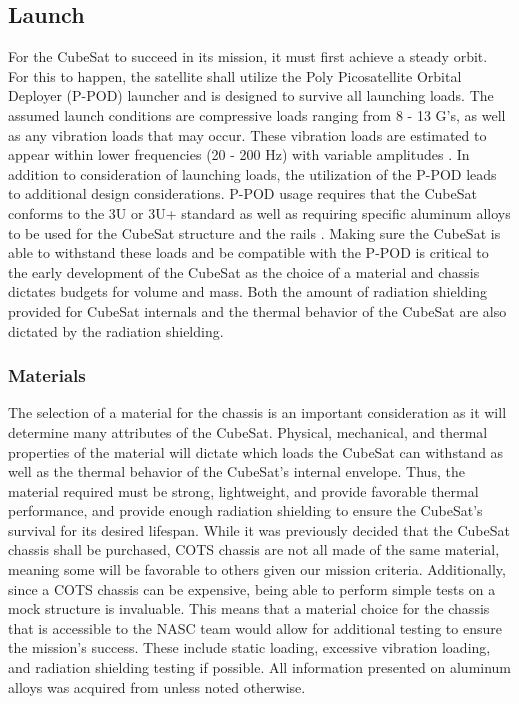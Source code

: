 
\subsection{Launch}
For the CubeSat to succeed in its mission, it must first achieve a steady orbit. For this to happen, the satellite shall utilize the Poly Picosatellite Orbital Deployer (P-POD) launcher and is designed to survive all launching loads. The assumed launch conditions are compressive loads ranging from 8 - 13 G's, as well as any vibration loads that may occur. These vibration loads are estimated to appear within lower frequencies (20 - 200 Hz) with variable amplitudes \cite{FEA2, FEA3, FEA4}. In addition to consideration of launching loads, the utilization of the P-POD leads to additional design considerations. P-POD usage requires that the CubeSat conforms to the 3U or 3U+ standard as well as requiring specific aluminum alloys to be used for the 
CubeSat structure and the rails \cite{CSS}. Making sure the CubeSat is able to withstand these loads and be compatible with the P-POD is critical to the early development of the CubeSat as the choice of a material and chassis dictates budgets for volume and mass. Both the amount of radiation shielding provided for CubeSat internals and the thermal behavior of the CubeSat are also dictated by the radiation shielding.
\subsubsection{Materials}
The selection of a material for the chassis is an important consideration as it will determine many attributes of the CubeSat. Physical, mechanical, and thermal properties of the material will dictate which loads the CubeSat can withstand as well as the thermal behavior of the CubeSat's internal envelope. Thus, the material required must be strong, lightweight, and provide favorable thermal performance, and provide enough radiation shielding to ensure the CubeSat's survival for its desired lifespan. While it was previously decided that the CubeSat chassis shall be purchased, COTS chassis are not all made of the same material, meaning some will be favorable to others given our mission criteria. Additionally, since a COTS chassis can be expensive, being able to perform simple tests on a mock structure is invaluable. This means that a material choice for the chassis that is accessible to the NASC team would allow for additional testing to ensure the mission's success. These include static loading, excessive vibration loading, and radiation shielding testing if possible. All information presented on aluminum alloys was acquired from \cite{ASM} unless noted otherwise.
